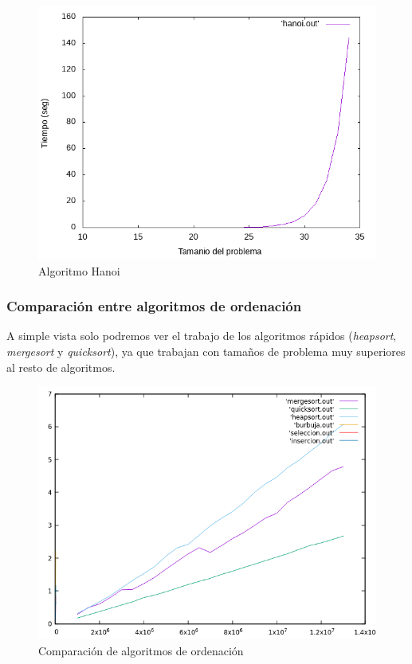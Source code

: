 \documentclass[12pt,spanish]{article}
\begin{document}
\begin{figure}[H]
\centering
\includegraphics[scale=0.75]{empirica_hanoi.png}
\caption{Algoritmo Hanoi}
\end{figure}

\subsubsection{Comparación entre algoritmos de ordenación}
A simple vista solo podremos ver el trabajo de los algoritmos rápidos (\textit{heapsort}, \textit{mergesort} y \textit{quicksort}), ya que trabajan con tamaños de problema muy superiores al resto de algoritmos.

\begin{figure}[H]
\centering
\includegraphics[scale=0.75]{empirica_ordenacion_comparacion.png}
\caption{Comparación de algoritmos de ordenación}
\end{figure}
\end{document}
